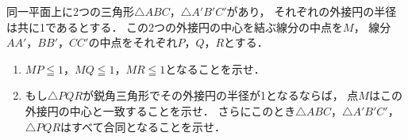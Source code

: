 \documentclass[../../main.tex]{subfiles}
\begin{document}
同一平面上に2つの三角形$\triangle ABC$，$\triangle A'B'C'$があり，
それぞれの外接円の半径は共に1であるとする．
この2つの外接円の中心を結ぶ線分の中点を$M$，
線分$AA'$，$BB'$，$CC'$の中点をそれぞれ$P$，$Q$，$R$とする．
\begin{enumerate}
  \item $MP\leqq1$，$MQ\leqq1$，$MR\leqq1$となることを示せ．
  \item もし$\triangle PQR$が鋭角三角形でその外接円の半径が1となるならば，
    点$M$はこの外接円の中心と一致することを示せ．
    さらにこのとき$\triangle ABC$，$\triangle A'B'C'$，$\triangle PQR$はすべて合同となることを示せ．
\end{enumerate}
\end{document}
